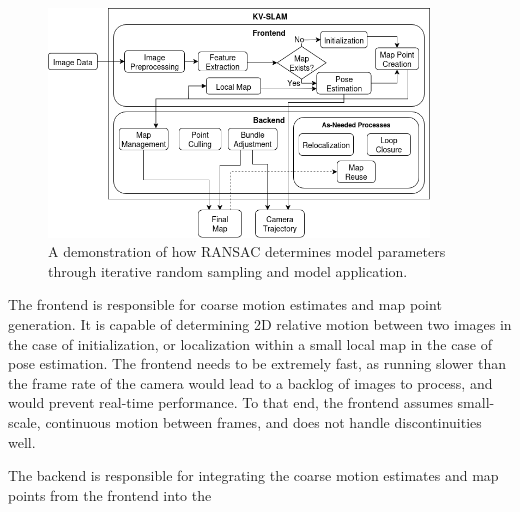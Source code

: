 \begin{figure}[!ht]
    \centering
    \includegraphics[width=0.9\textwidth]{resources/subprocesses.png}
    \caption[KV-SLAM Subprocesses]{A demonstration of how RANSAC determines model parameters through iterative random sampling and model application.}
    \label{fig:subprocesses}
\end{figure}

The frontend is responsible for coarse motion estimates and map point generation. It is capable of determining 2D relative motion between two images in the case of initialization, or localization within a small local map in the case of pose estimation. The frontend needs to be extremely fast, as running slower than the frame rate of the camera would lead to a backlog of images to process, and would prevent real-time performance. To that end, the frontend assumes small-scale, continuous motion between frames, and does not handle discontinuities well.

The backend is responsible for integrating the coarse motion estimates and map points from the frontend into the 